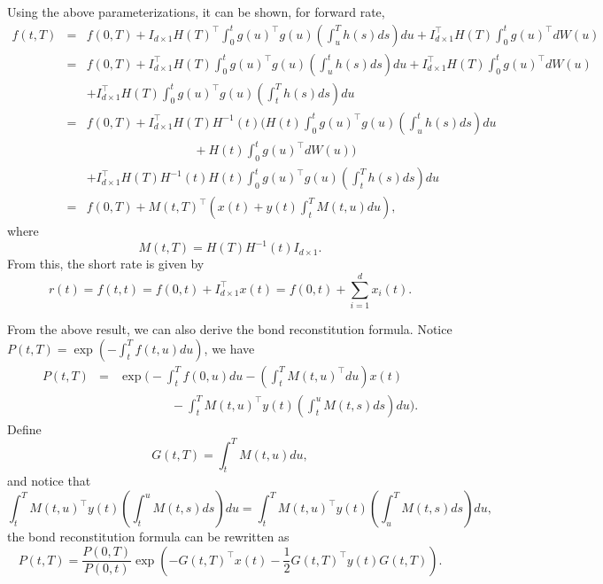 \documentclass[12pt]{article}
\begin{document}
  Using the above parameterizations, it can be shown, for forward rate,
  \begin{eqnarray}
    f(t,T) &=& f(0,T)+I_{d\times 1}H(T)^{\top}\int_0^tg(u)^{\top}g(u)\left(\int_u^Th(s)ds\right)du
              +I_{d\times 1}^{\top}H(T)\int_0^tg(u)^{\top}dW(u)\nonumber\\
           &=& f(0,T)+I_{d\times 1}^{\top}H(T)\int_0^tg(u)^{\top}g(u)\left(\int_u^th(s)ds\right)du
              +I_{d\times 1}^{\top}H(T)\int_0^tg(u)^{\top}dW(u)\nonumber\\
           && + I_{d\times 1}^{\top}H(T)\int_0^tg(u)^{\top}g(u)\left(\int_t^Th(s)ds\right)du\nonumber\\
           &=& f(0,T)+I_{d\times 1}^{\top}H(T)H^{-1}(t)\Big(H(t)\int_0^tg(u)^{\top}g(u)\left(\int_u^th(s)ds\right)du\nonumber\\
           &&\ \ \ \ \ \ \ \ \ \ \ \ \ \ \ \ \ \ \ \ \ \ \ \ \ \ \ \ \ \ \ \ \ \ \ \ \ \ \ +H(t)\int_0^tg(u)^{\top}dW(u)\Big)\nonumber\\
           && + I_{d\times 1}^{\top}H(T)H^{-1}(t)H(t)\int_0^tg(u)^{\top}g(u)\left(\int_t^Th(s)ds\right)du\nonumber\\
           &=& f(0,T)+M(t,T)^{\top}\left(x(t)+y(t)\int_t^TM(t,u)du\right),
  \end{eqnarray}
  where
  \begin{equation}
    M(t,T)=H(T)H^{-1}(t)I_{d\times 1}.
  \end{equation}
  From this, the short rate is given by
  \begin{equation}
    r(t)=f(t,t)=f(0,t)+I_{d\times 1}^{\top}x(t)=f(0,t)+\sum_{i=1}^dx_i(t).
  \end{equation}


  From the above result, we can also derive the bond reconstitution formula. Notice $P(t,T)=\exp\left(-\int_t^Tf(t,u)du\right)$, we have
  \begin{eqnarray}
    P(t,T)&=&\exp\Bigg(-\int_t^Tf(0,u)du-\left(\int_t^TM(t,u)^{\top}du\right)x(t) \nonumber\\
          &&\ \ \ \ \ \ \ \ \ \ \ \ \ \ \ \ \ \ \ -\int_t^TM(t,u)^{\top}y(t)\left(\int_t^uM(t,s)ds\right)du\Bigg).
  \end{eqnarray}
  Define
  \begin{equation}
    G(t,T)=\int_t^TM(t,u)du,
  \end{equation}
  and notice that
  \begin{equation}
    \int_t^TM(t,u)^{\top}y(t)\left(\int_t^uM(t,s)ds\right)du = \int_t^TM(t,u)^{\top}y(t)\left(\int_u^TM(t,s)ds\right)du,
  \end{equation}
  the bond reconstitution formula can be rewritten as
  \begin{equation}
    P(t,T)=\frac{P(0,T)}{P(0,t)}\exp\left(-G(t,T)^{\top}x(t)-\frac{1}{2}G(t,T)^{\top}y(t)G(t,T)\right).
    \label{reconstitution}
  \end{equation}
\end{document}
